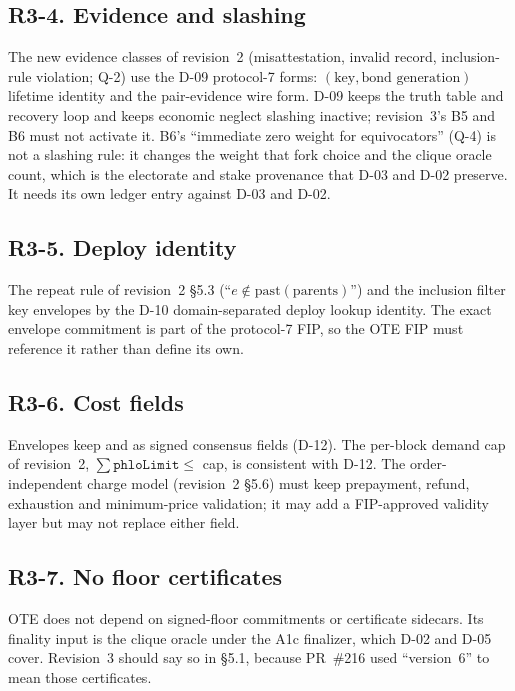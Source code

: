 \documentclass[11pt]{article}
\newcommand{\code}{\path}
\begin{document}
\subsection{R3-4. Evidence and slashing}

The new evidence classes of revision~2 (misattestation, invalid record, inclusion-rule violation; Q-2) use the D-09 protocol-7 forms: $(\text{key}, \text{bond generation})$ lifetime identity and the pair-evidence wire form. D-09 keeps the \code{dev} truth table and recovery loop and keeps economic neglect slashing inactive; revision~3's B5 and B6 must not activate it. B6's ``immediate zero weight for equivocators'' (Q-4) is not a slashing rule: it changes the weight that fork choice and the clique oracle count, which is the electorate and stake provenance that D-03 and D-02 preserve. It needs its own ledger entry against D-03 and D-02.

\subsection{R3-5. Deploy identity}

The repeat rule of revision~2 \S5.3 (``$e \notin \mathrm{past}(\mathrm{parents})$'') and the inclusion filter key envelopes by the D-10 domain-separated deploy lookup identity. The exact envelope commitment is part of the protocol-7 FIP, so the OTE FIP must reference it rather than define its own.

\subsection{R3-6. Cost fields}

Envelopes keep \code{phloLimit} and \code{phloPrice} as signed consensus fields (D-12). The per-block demand cap of revision~2, $\sum \mathtt{phloLimit} \le$ cap, is consistent with D-12. The order-independent charge model (revision~2 \S5.6) must keep prepayment, refund, exhaustion and minimum-price validation; it may add a FIP-approved validity layer but may not replace either field.

\subsection{R3-7. No floor certificates}

OTE does not depend on signed-floor commitments or certificate sidecars. Its finality input is the clique oracle under the A1c finalizer, which D-02 and D-05 cover. Revision~3 should say so in \S5.1, because PR~\#216 used ``version~6'' to mean those certificates.
\end{document}
